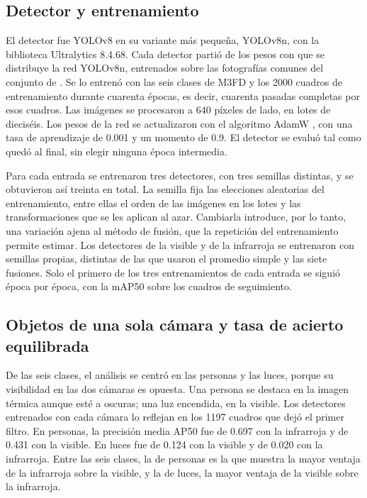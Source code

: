 \subsection{Detector y entrenamiento}
\label{sec:det-detector}

El detector fue YOLOv8 \parencite{jocher2023} en su variante más pequeña, YOLOv8n, con la biblioteca
Ultralytics 8.4.68. Cada detector partió de los pesos con que se distribuye la red YOLOv8n,
entrenados sobre las fotografías comunes del conjunto de \textcite{lin2014}. Se lo entrenó con las seis
clases de M3FD y los 2000 cuadros de entrenamiento durante cuarenta épocas, es decir, cuarenta pasadas
completas por esos cuadros. Las imágenes se procesaron a 640 píxeles de lado, en lotes de dieciséis.
Los pesos de la red se actualizaron con el algoritmo AdamW \parencite{loshchilov2019}, con una tasa de
aprendizaje de 0.001 y un momento de 0.9. El detector se evaluó tal como quedó al final, sin elegir
ninguna época intermedia.

Para cada entrada se entrenaron tres detectores, con tres semillas distintas, y se obtuvieron así
treinta en total. La semilla fija las elecciones aleatorias del entrenamiento, entre ellas el orden de
las imágenes en los lotes y las transformaciones que se les aplican al azar. Cambiarla introduce, por lo
tanto, una variación ajena al método de fusión, que la repetición del entrenamiento permite estimar. Los detectores de la visible y
de la infrarroja se entrenaron con semillas propias, distintas de las que usaron el promedio simple y las
siete fusiones. Solo el primero de los tres entrenamientos de cada entrada se siguió época por época,
con la mAP50 sobre los cuadros de seguimiento.

\subsection{Objetos de una sola cámara y tasa de acierto equilibrada}
\label{sec:det-medida}

De las seis clases, el análisis se centró en las personas y las luces, porque su visibilidad en las dos
cámaras es opuesta. Una persona se destaca en la imagen térmica aunque esté a oscuras; una luz
encendida, en la visible. Los detectores entrenados con cada cámara lo reflejan en los 1197 cuadros que
dejó el primer filtro. En personas, la precisión media AP50 fue de 0.697 con la infrarroja y de 0.431
con la visible. En luces fue de 0.124 con la visible y de 0.020 con la infrarroja. Entre las seis
clases, la de personas es la que muestra la mayor ventaja de la infrarroja sobre la visible, y la de
luces, la mayor ventaja de la visible sobre la infrarroja.

